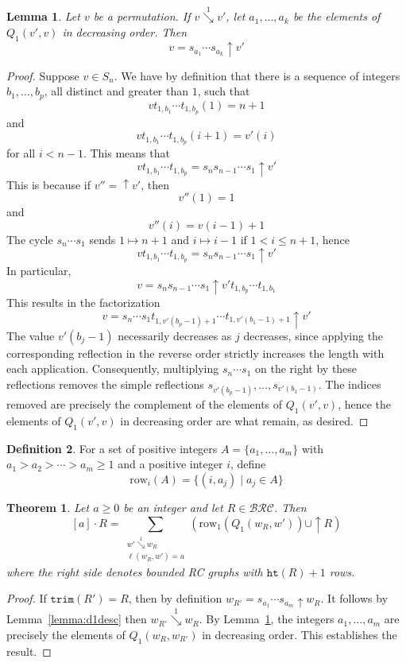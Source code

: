\documentclass{amsart}
\newtheorem{lemma}{Lemma}[subsection]
\newtheorem{theorem}{Theorem}[section]
\theoremstyle{definition}
\newtheorem{definition}[lemma]{Definition}
\theoremstyle{remark}
\numberwithin{equation}{subsection}
\newcommand{\shup}{{\uparrow}}
\newcommand{\downvar}[1]{\stackrel{#1}{\searrow}}
\newcommand{\wof}[1]{w_{#1}}
\newcommand{\trm}{\mathtt{trim}}
\newcommand{\hr}{\mathtt{ht}}
\newcommand{\BRC}{\mathcal{BRC}}
\begin{document}
\begin{lemma}\label{lemma:factor}
Let $v$ be a permutation. If $v\downvar{1} v'$, let $a_1,\ldots, a_k$ be the elements of $Q_1(v',v)$ in decreasing order. Then
$$v=s_{a_1}\cdots s_{a_k}\shup{v'}$$
\end{lemma}
\begin{proof}
	Suppose $v\in S_{n}$. We have by definition that there is a sequence of integers $b_1,\ldots,b_p$, all distinct and greater than $1$, such that
	$$vt_{1,b_1}\cdots t_{1, b_p}(1) = n + 1$$
	and
	$$vt_{1,b_1}\cdots t_{1, b_p}(i+1) = v'(i)$$
	for all $i<n-1$. This means that
	$$vt_{1,b_1}\cdots t_{1, b_p} = s_ns_{n-1}\cdots s_1\shup{v'}$$
	This is because if $v''=\shup{v'}$, then
	$$v''(1)=1$$
	and
	$$v''(i) = v(i-1)+1$$
	The cycle $s_n\cdots s_1$ sends $1\mapsto n+1$ and $i\mapsto i-1$ if $1<i\leq n+1$, hence
	$$vt_{1,b_1}\cdots t_{1, b_p} = s_ns_{n-1}\cdots s_1\shup{v'}$$
	In particular,
	$$v = s_ns_{n-1}\cdots s_1\shup{v'}t_{1,b_p}\cdots t_{1, b_1}$$
	This results in the factorization
	$$v = s_n\cdots s_1t_{1,v'(b_p-1)+1}\cdots t_{1,v'(b_1-1)+1}\shup{v'}$$
	The value $v'(b_j-1)$ necessarily decreases as $j$ decreases, since applying the corresponding reflection in the reverse order strictly increases the length with each application.  Consequently, multiplying $s_n\cdots s_1$ on the right by these reflections removes the simple reflections $s_{v'(b_p-1)},\ldots, s_{v'(b_1-1)}$. The indices removed are precisely the complement of the elements of $Q_1(v',v)$, hence the elements of $Q_1(v',v)$ in decreasing order are what remain, as desired.
\end{proof}

\begin{definition}
For a set of positive integers $A=\{a_1,\ldots, a_m\}$ with $a_1>a_2>\cdots > a_m\geq 1$ and a positive integer $i$, define
$$\mathrm{row}_i(A) = \{(i, a_j) \mid a_j\in A\}$$
\end{definition}

\begin{theorem} \label{theorem:modactrc}
Let $a\geq 0$ be an integer and let $R\in \BRC$. Then
$$[a]\cdot R = \sum_{\substack{w'\downvar{1}\wof{R}\\\ell(\wof{R},w')=a}} \left(\mathrm{row}_1(Q_1(\wof{R},w'))\cup \shup{R}\right)$$
where the right side denotes bounded RC graphs with $\hr(R)+1$ rows.
\end{theorem}
\begin{proof}
	If $\trm(R') = R$, then by definition $\wof{R'} = s_{a_1}\cdots s_{a_m}\shup \wof{R}$. It follows by Lemma~\ref{lemma:d1desc} then $\wof{R'}\downvar{1}\wof{R}$. By Lemma~\ref{lemma:factor}, the integers $a_1,\ldots, a_m$ are precisely the elements of $Q_1(\wof{R},\wof{R'})$ in decreasing order. This establishes the result.
\end{proof}
\end{document}
